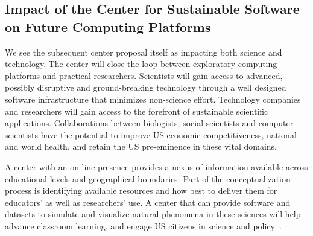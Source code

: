 \subsection{Impact of the Center for Sustainable Software on Future Computing Platforms}
We see the
subsequent center proposal itself as impacting both science and technology. The center will close
the loop between exploratory computing platforms and practical researchers. Scientists will gain
access to advanced, possibly disruptive and ground-breaking technology through a well designed
software infrastructure that minimizes non-science effort. Technology companies and researchers
will gain access to the forefront of sustainable scientific applications. Collaborations between
biologists, social scientists and computer scientists have the potential to improve US economic
competitiveness, national and world health, and retain the US pre-eminence in these vital domains.

A center with an on-line presence provides a nexus of information available across educational
levels and geographical boundaries. Part of the conceptualization process is identifying available
resources and how best to deliver them for educators’ as well as researchers’ use. A center that can
provide software and datasets to simulate and visualize natural phenomena in these sciences will
help advance classroom learning, and engage US citizens in science and policy~\cite{Xie24062011}.

